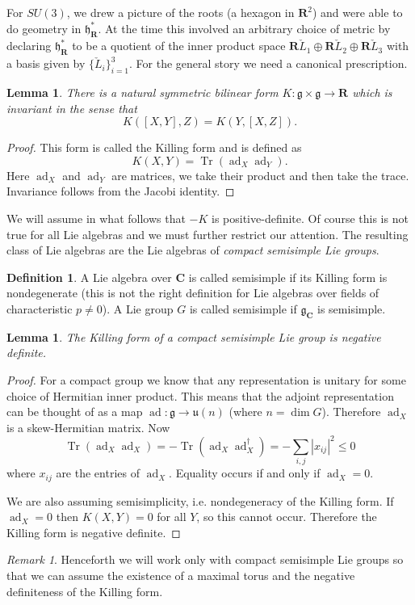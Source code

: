 \documentclass[12pt]{article}
\newcommand{\CC}{\mathbf{C}}
\newcommand{\RR}{\mathbf{R}}
\newcommand{\OP}{\operatorname}
\newcommand{\ad}{\OP{ad}}
\newtheorem{lma}[thm]{Lemma}
\theoremstyle{definition}
\newtheorem{dfn}[thm]{Definition}
\theoremstyle{check}
\theoremstyle{remark}
\newtheorem{rmk}[thm]{Remark}
\theoremstyle{TheoremNum}
\begin{document}
For $SU(3)$, we drew a picture of the roots (a hexagon in $\RR^2$) and were able to do geometry in $\mathfrak{h}^*_{\RR}$. At the time this involved an arbitrary choice of metric by declaring $\mathfrak{h}^*_{\RR}$ to be a quotient of the inner product space $\RR\check{L}_1\oplus\RR\check{L}_2\oplus\RR\check{L}_3$ with a basis given by $\{\check{L}_i\}_{i=1}^3$. For the general story we need a canonical prescription.
\begin{lma}
There is a natural symmetric bilinear form $K\colon\mathfrak{g}\times\mathfrak{g}\to\RR$ which is {\em invariant} in the sense that
\[K([X,Y],Z)=K(Y,[X,Z]).\]
\end{lma}
\begin{proof}
This form is called the Killing form and is defined as
\[K(X,Y)=\OP{Tr}(\ad_X\ad_Y).\]
Here $\ad_X$ and $\ad_Y$ are matrices, we take their product and then take the trace. Invariance follows from the Jacobi identity.
\end{proof}
We will assume in what follows that $-K$ is positive-definite. Of course this is not true for all Lie algebras and we must further restrict our attention. The resulting class of Lie algebras are the Lie algebras of {\em compact semisimple Lie groups}.
\begin{dfn}
A Lie algebra over $\CC$ is called semisimple if its Killing form is nondegenerate (this is not the right definition for Lie algebras over fields of characteristic $p\neq 0$). A Lie group $G$ is called semisimple if $\mathfrak{g}_{\CC}$ is semisimple.
\end{dfn}
\begin{lma}
The Killing form of a compact semisimple Lie group is negative definite.
\end{lma}
\begin{proof}
For a compact group we know that any representation is unitary for some choice of Hermitian inner product. This means that the adjoint representation can be thought of as a map $\ad\colon\mathfrak{g}\to\mathfrak{u}(n)$ (where $n=\dim G$). Therefore $\ad_X$ is a skew-Hermitian matrix. Now
\[\OP{Tr}(\ad_X\ad_X)=-\OP{Tr}(\ad_X\ad_X^{\dagger})=-\sum_{i,j}|x_{ij}|^2\leq 0\]
where $x_{ij}$ are the entries of $\ad_X$. Equality occurs if and only if $\ad_X=0$.

We are also assuming semisimplicity, i.e. nondegeneracy of the Killing form. If $\ad_X=0$ then $K(X,Y)=0$ for all $Y$, so this cannot occur. Therefore the Killing form is negative definite.
\end{proof}
\begin{rmk}
Henceforth we will work only with compact semisimple Lie groups so that we can assume the existence of a maximal torus and the negative definiteness of the Killing form.
\end{rmk}
\end{document}
